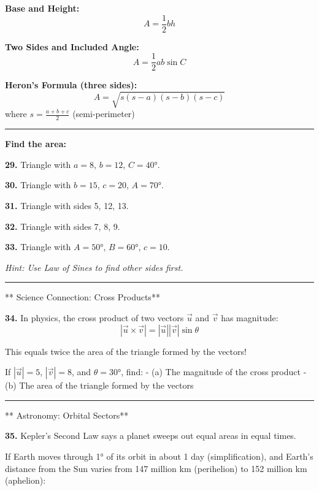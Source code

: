 \documentclass[
  11pt,
]{article}
\begin{document}
\textbf{Base and Height:} \[A = \frac{1}{2}bh\]

\textbf{Two Sides and Included Angle:}
\[\boxed{A = \frac{1}{2}ab\sin C}\]

\textbf{Heron's Formula (three sides):} \[A = \sqrt{s(s-a)(s-b)(s-c)}\]
where \(s = \frac{a+b+c}{2}\) (semi-perimeter)

\begin{center}\rule{0.5\linewidth}{0.5pt}\end{center}

\textbf{Find the area:}

\textbf{29.} Triangle with \(a = 8\), \(b = 12\), \(C = 40°\).

\textbf{30.} Triangle with \(b = 15\), \(c = 20\), \(A = 70°\).

\textbf{31.} Triangle with sides 5, 12, 13.

\textbf{32.} Triangle with sides 7, 8, 9.

\textbf{33.} Triangle with \(A = 50°\), \(B = 60°\), \(c = 10\).

\emph{Hint: Use Law of Sines to find other sides first.}

\begin{center}\rule{0.5\linewidth}{0.5pt}\end{center}

** Science Connection: Cross Products**

\textbf{34.} In physics, the cross product of two vectors \(\vec{u}\)
and \(\vec{v}\) has magnitude:
\[|\vec{u} \times \vec{v}| = |\vec{u}||\vec{v}|\sin\theta\]

This equals twice the area of the triangle formed by the vectors!

If \(|\vec{u}| = 5\), \(|\vec{v}| = 8\), and \(\theta = 30°\), find: -
(a) The magnitude of the cross product - (b) The area of the triangle
formed by the vectors

\begin{center}\rule{0.5\linewidth}{0.5pt}\end{center}

** Astronomy: Orbital Sectors**

\textbf{35.} Kepler's Second Law says a planet sweeps out equal areas in
equal times.

If Earth moves through 1° of its orbit in about 1 day (simplification),
and Earth's distance from the Sun varies from 147 million km
(perihelion) to 152 million km (aphelion):
\end{document}
